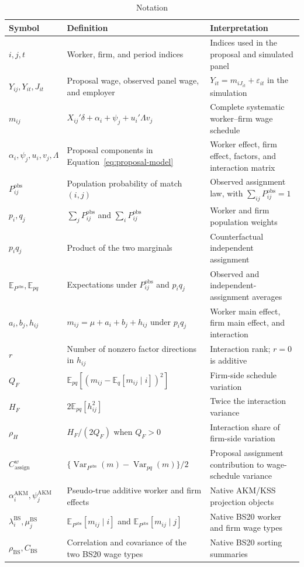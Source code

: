 \documentclass[11pt]{article}
\newcommand{\E}{\mathbb{E}}
\newcommand{\Var}{\operatorname{Var}}
\newcommand{\QF}{Q_F}
\newcommand{\HF}{H_F}
\newcommand{\rhoH}{\rho_H}
\newcommand{\Cassign}{C^{w}_{\mathrm{assign}}}
\newcommand{\CBS}{C_{\mathrm{BS}}}
\newcommand{\rhoBS}{\rho_{\mathrm{BS}}}
\begin{document}
\begin{table}[H]
\centering
\caption{Notation}
\label{tab:notation}
\small
\begin{tabularx}{\textwidth}{>{\raggedright\arraybackslash}p{}
>{\raggedright\arraybackslash}p{}
>{\raggedright\arraybackslash}X}
\toprule
Symbol & Definition & Interpretation \\
\midrule
$i,j,t$ & Worker, firm, and period indices & Indices used in the proposal and simulated panel \\
$Y_{ij},Y_{it},J_{it}$ & Proposal wage, observed panel wage, and employer & $Y_{it}=m_{iJ_{it}}+\varepsilon_{it}$ in the simulation \\
$m_{ij}$ & $X_{ij}'\delta+\alpha_i+\psi_j+u_i'\Lambda v_j$ & Complete systematic worker--firm wage schedule \\
$\alpha_i,\psi_j,u_i,v_j,\Lambda$ & Proposal components in Equation~\eqref{eq:proposal-model} & Worker effect, firm effect, factors, and interaction matrix \\
$P^{\mathrm{obs}}_{ij}$ & Population probability of match $(i,j)$ & Observed assignment law, with $\sum_{ij}P^{\mathrm{obs}}_{ij}=1$ \\
$p_i,q_j$ & $\sum_jP^{\mathrm{obs}}_{ij}$ and $\sum_iP^{\mathrm{obs}}_{ij}$ & Worker and firm population weights \\
$p_iq_j$ & Product of the two marginals & Counterfactual independent assignment \\
$\E_{P^{\mathrm{obs}}},\E_{pq}$ & Expectations under $P^{\mathrm{obs}}_{ij}$ and $p_iq_j$ & Observed and independent-assignment averages \\
$a_i,b_j,h_{ij}$ & $m_{ij}=\mu+a_i+b_j+h_{ij}$ under $p_iq_j$ & Worker main effect, firm main effect, and interaction \\
$r$ & Number of nonzero factor directions in $h_{ij}$ & Interaction rank; $r=0$ is additive \\
$\QF$ & $\E_{pq}[(m_{ij}-\E_q[m_{ij}\mid i])^2]$ & Firm-side schedule variation \\
$\HF$ & $2\E_{pq}[h_{ij}^2]$ & Twice the interaction variance \\
$\rhoH$ & $\HF/(2\QF)$ when $\QF>0$ & Interaction share of firm-side variation \\
$\Cassign$ & $\{\Var_{P^{\mathrm{obs}}}(m)-\Var_{pq}(m)\}/2$ & Proposal assignment contribution to wage-schedule variance \\
$\alpha_i^{\mathrm{AKM}},\psi_j^{\mathrm{AKM}}$ & Pseudo-true additive worker and firm effects & Native AKM/KSS projection objects \\
$\lambda_i^{\mathrm{BS}},\mu_j^{\mathrm{BS}}$ & $\E_{P^{\mathrm{obs}}}[m_{ij}\mid i]$ and $\E_{P^{\mathrm{obs}}}[m_{ij}\mid j]$ & Native BS20 worker and firm wage types \\
$\rhoBS,\CBS$ & Correlation and covariance of the two BS20 wage types & Native BS20 sorting summaries \\
\bottomrule
\end{tabularx}
\end{table}
\end{document}
